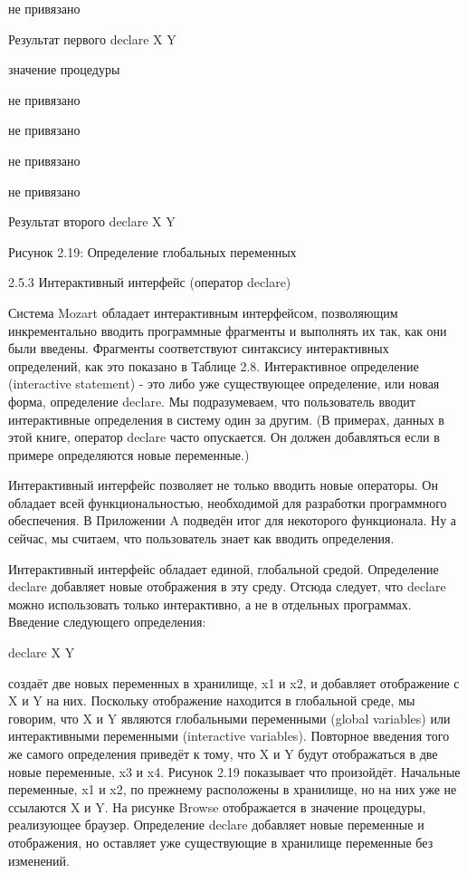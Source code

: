 не привязано

Результат первого declare X Y

значение процедуры

не привязано

не привязано

не привязано

не привязано

Результат второго declare X Y

Рисунок 2.19: Определение глобальных переменных

2.5.3 Интерактивный интерфейс (оператор declare)

Система Mozart обладает интерактивным интерфейсом, позволяющим инкрементально вводить программные фрагменты и выполнять их так, как они были введены. Фрагменты соответствуют синтаксису интерактивных определений, как это показано в Таблице 2.8. Интерактивное определение (interactive statement) - это либо уже существующее определение, или новая форма, определение declare. Мы подразумеваем, что пользователь вводит интерактивные определения в систему один за другим. (В примерах, данных в этой книге, оператор declare часто опускается. Он должен добавляться если в примере определяются новые переменные.)

Интерактивный интерфейс позволяет не только вводить новые операторы. Он обладает всей функциональностью, необходимой для разработки программного обеспечения. В Приложении A подведён итог для некоторого функционала. Ну а сейчас, мы считаем, что пользователь знает как вводить определения.

Интерактивный интерфейс обладает единой, глобальной средой. Определение declare добавляет новые отображения в эту среду. Отсюда следует, что declare можно использовать только интерактивно, а не в отдельных программах. Введение следующего определения:

declare X Y

создаёт две новых переменных в хранилище, x1 и x2, и добавляет отображение с X и Y на них. Поскольку отображение находится в глобальной среде, мы говорим, что X и Y являются глобальными переменными (global variables) или интерактивными переменными (interactive variables). Повторное введения того же самого определения приведёт к тому, что X и Y будут отображаться в две новые переменные, x3 и x4. Рисунок 2.19 показывает что произойдёт. Начальные переменные, x1 и x2, по прежнему расположены в хранилище, но на них уже не ссылаются X и Y. На рисунке Browse отображается в значение процедуры, реализующее браузер. Определение declare добавляет новые переменные и отображения, но оставляет уже существующие в хранилище переменные без изменений.

